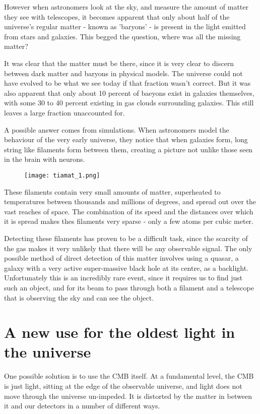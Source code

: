 \documentclass{nature}
\begin{document}
However when astronomers look at the sky, and measure the amount of matter they see with telescopes, it becomes apparent that only about half of the universe's regular matter - known as 'baryons' - is present in the light emitted from stars and galaxies. This begged the question, where was all the missing matter? 

It was clear that the matter must be there, since it is very clear to discern between dark matter and baryons in physical models. The universe could not have evolved to be what we see today if that fraction wasn't correct. But it was also apparent that only about 10 percent of baeyons exist in galaxies themselves, with some 30 to 40 percent existing in gas clouds surrounding galaxies. This still leaves a large fraction unaccounted for. 

A possible answer comes from simulations. When astronomers model the behaviour of the very early universe, they notice that when galaxies form, long string like filaments form between them, creating a picture not unlike those seen in the brain with neurons.

\begin{figure}
    \texttt{[image: tiamat\_1.png]}
\end{figure}


These filaments contain very small amounts of matter, superheated to temperatures between thousands and millions of degrees, and spread out over the vast reaches of space. The combination of its speed and the distances over which it is spread makes thes filaments very sparse - only a few atoms per cubic meter. 

Detecting these filaments  has proven to be a difficult task, since the scarcity of the gas makes it very unlikely that there will be any observable signal. The only possible method of direct detection of this matter involves using a quasar, a galaxy with a very active super-massive black hole at its centre, as a backlight. Unfortunately this is an incredibly rare event, since it requires us to find just such an object, and for its beam to pass through both a filament and a telescope that is observing the sky and can see the object. 

\section{A new use for the oldest light in the universe}

One possible solution is to use the CMB itself. At a fundamental level, the CMB is just light, sitting at the edge of the observable universe, and light does not move through the universe un-impeded. It is distorted by the matter in between it and our detectors in a number of different ways.
\end{document}

